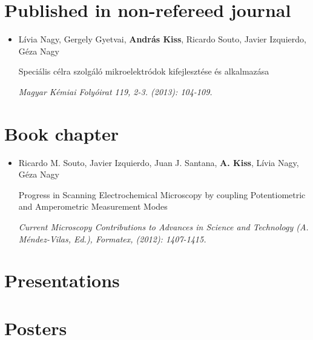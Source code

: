 \section*{Published in non-refereed journal}
\begin{itemize}

\item[] Lívia Nagy, Gergely Gyetvai, \textbf{András Kiss}, Ricardo Souto, Javier Izquierdo, Géza Nagy

Speciális célra szolgáló mikroelektródok kifejlesztése és alkalmazása

\emph{Magyar Kémiai Folyóirat 119, 2-3. (2013): 104-109.}
\end{itemize}

\section*{Book chapter}
\begin{itemize}

\item[] Ricardo M. Souto, Javier Izquierdo, Juan J. Santana, \textbf{A. Kiss}, Lívia Nagy, Géza Nagy

Progress in Scanning Electrochemical Microscopy by coupling Potentiometric and Amperometric Measurement Modes

\emph{Current Microscopy Contributions to Advances in Science and Technology (A. Méndez-Vilas, Ed.), Formatex, (2012): 1407-1415.}
\end{itemize}


\section*{Presentations}

\section*{Posters}
